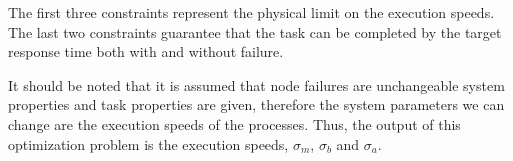 The first three constraints represent the physical limit on the execution speeds. 
The last two constraints guarantee that the task can be completed by the target 
response time both with and without failure.

It should be noted that it is assumed that node failures are unchangeable 
system properties and task
properties are given, therefore the system
parameters we can change are the execution speeds of the
processes. Thus, the output of this optimization problem is the
execution speeds, $\sigma_m$, $\sigma_b$ and $\sigma_a$. 

